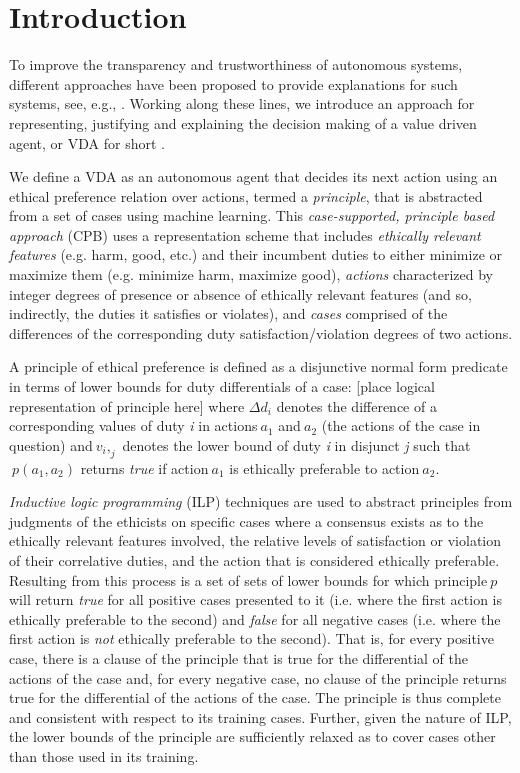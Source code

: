 \documentclass[letterpaper]{article} %
\begin{document}
\section{Introduction}
To improve the transparency and trustworthiness of autonomous systems, different approaches have been proposed to provide explanations for such systems, see, e.g., \cite{Cocarascu2018,DBLP:conf/ijcai/ShihCD18,DBLP:journals/corr/abs-1806-08055}. Working along these lines, we introduce an approach for representing, justifying and explaining the decision making of a value driven agent, or VDA for short \cite{DBLP:conf/aaai/AndersonAB17}.  

We define a VDA as an autonomous agent that decides its next action using an ethical preference relation over actions, termed a \textit{principle}, that is abstracted from a set of cases using machine learning. This \textit{case-supported, principle based approach} (CPB) uses a representation scheme that includes \textit{ethically relevant features} (e.g. harm, good, etc.) and their incumbent duties to either minimize or maximize them (e.g. minimize harm, maximize good), \textit{actions} characterized by integer degrees of presence or absence of ethically relevant features (and so, indirectly, the duties it satisfies or violates), and \textit{cases} comprised of the differences of the corresponding duty satisfaction/violation degrees of two actions.  	

A principle of ethical preference is defined as a disjunctive normal form predicate in terms of lower bounds for duty differentials of a case: 
[place logical representation of principle here]
where $\Delta d_i$ denotes the difference of a corresponding values of duty \textit{i} in actions$\ a_1$ and$\ a_2$ (the actions of the case in question) and$\ v_i,_j$ denotes the lower bound of duty \textit{i} in disjunct \textit{j} such that$\ p(a_1,a_2)$ returns \textit{true} if action$\ a_1$  is ethically preferable to action$\ a_2$.  

\textit{Inductive logic programming} (ILP) techniques are used to abstract principles from judgments of the ethicists on specific cases where a consensus exists as to the ethically relevant features involved, the relative levels of satisfaction or violation of their correlative duties, and the action that is considered ethically preferable.  Resulting from this process is a set of sets of lower bounds for which principle$\ p$ will return \textit{true} for all positive cases presented to it (i.e. where the first action is ethically preferable to the second) and \textit{false} for all negative cases (i.e. where the first action is \textit{not} ethically preferable to the second). That is, for every positive case, there is a clause of the principle that is true for the differential of the actions of the case and, for every negative case, no clause of the principle returns true for the differential of the actions of the case.  The principle is thus complete and consistent with respect to its training cases.  Further, given the nature of ILP, the lower bounds of the principle are sufficiently relaxed as to cover cases other than those used in its training.
\end{document}
